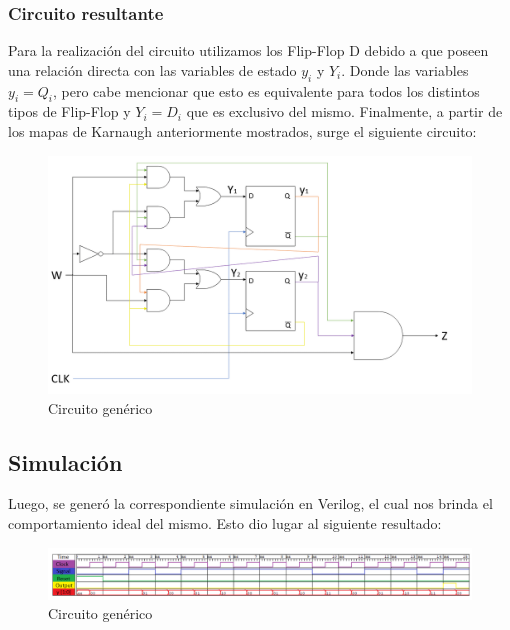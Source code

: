 \begin{center}
	\hspace*{\fill}
\end{center}
\subsubsection{Circuito resultante}
Para la realización del circuito utilizamos los Flip-Flop D debido a que poseen una relación directa con las variables de estado $y_i$ y $Y_i$. Donde las variables $y_i=Q_i$, pero cabe mencionar que esto es equivalente para todos los distintos tipos de Flip-Flop y $Y_i=D_i$ que es exclusivo del mismo.
Finalmente, a partir de los mapas de Karnaugh anteriormente mostrados, surge el siguiente circuito:\\
\begin{figure}[H]
	\centering
	\includegraphics[scale=0.4]{Ejercicio2/Circuito.png}
	\caption{Circuito genérico}
\end{figure}
\subsection{Simulación}
Luego, se generó la correspondiente simulación en Verilog, el cual nos brinda el comportamiento ideal del mismo. Esto dio lugar al siguiente resultado:\\
\begin{figure}[H]
	\centering
	\includegraphics[scale=0.5]{Ejercicio2/Simulacion.png}
	\caption{Circuito genérico}
\end{figure}
